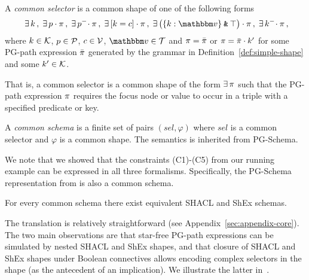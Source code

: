 \begin{definition}
\label{def:common-selector}
A \emph{common selector} is a common shape of one of the following forms
\[ 
\exists\, k \,,\;
\exists\, p \cdot \pexpr\,, \;
\exists\, p^{-}\!\cdot \pexpr \,,\;
\exists\, \keyIsVal{k}{c}\cdot \pexpr \,, \;
\exists\, \big(\{k:\vtype\}\tAnd\top\big)\cdot \pexpr \,, \;
\exists\, k^{-}\!\cdot \pexpr\,,\!\!
\]
where $k\in\mathcal{K}$,  $p\in\mathcal{P}$, $c\in \mathcal{V}$, $\vtype\in\ValueTypes$ and $\pi = \bar{\pi}$ or $\pi = \bar{\pi}\cdot k'$ for some PG-path expression $\bar{\pi}$ generated by the grammar in Definition~\ref{def:simple-shape} and some $k'\in\mathcal{K}$.
\end{definition}

That is, a common selector is a common shape of the form $\exists\, \pi$ such that  the PG-path expression $\pi$ requires the focus node or value to occur in a triple with a specified predicate or key. 


A \emph{common schema} is a finite set of  pairs $(\textit{sel}, \varphi)$ where $\textit{sel}$ is a common selector and $\varphi$ is a common shape. The semantics is inherited from PG-Schema. 

We note that we showed that the constraints (C1)-(C5) from our running example can be expressed in all three formalisms. Specifically, the PG-Schema representation from  is also a common schema. 

\begin{proposition}
\label{prop:core}
For every common schema there exist equivalent SHACL and ShEx schemas. 
\end{proposition}

The translation is relatively straightforward (see Appendix~\ref{sec:appendix-core}). The two main observations are that star-free PG-path expressions can be simulated by nested SHACL and ShEx shapes, and that closure of SHACL and ShEx shapes under Boolean connectives  allows encoding complex selectors in the shape (as the antecedent of an implication). We illustrate the latter in~.

